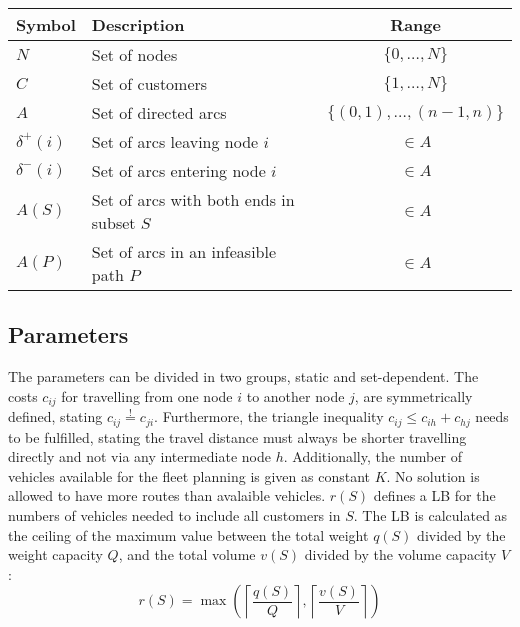 \begin{table}[ht]
    \centering
    \begin{tabular}{llc}
        \toprule
        Symbol        & Description                              & Range                         \\
        \midrule
        $N$           & Set of nodes                             & $\{ 0, \dots, N \}$           \\
        $C$           & Set of customers                         & $\{ 1, \dots, N \} $          \\
        $A$           & Set of directed arcs                     & $\{(0,1), \dots, (n-1, n) \}$ \\
        $\delta^+(i)$ & Set of arcs leaving node $i$             & $\in A$                       \\
        $\delta^-(i)$ & Set of arcs entering node $i$            & $\in A$                       \\
        $A(S)$        & Set of arcs with both ends in subset $S$ & $\in A$                       \\
        $A(P)$        & Set of arcs in an infeasible path $P$    & $\in A$                       \\
        \bottomrule
    \end{tabular}
\end{table}
\vspace{0.2em}

\subsection*{Parameters}
The parameters can be divided in two groups, static and set-dependent.
The costs $c_{ij}$ for travelling from one node $i$ to another node $j$,
are symmetrically defined, stating $c_{ij} \overset{!}{=} c_{ji}$. Furthermore, the triangle inequality
$c_{ij} \leq c_{ih} + c_{hj}$ needs to be fulfilled, stating the travel distance must always be shorter travelling
directly and not via any intermediate node $h$. Additionally, the number of vehicles
available for the fleet planning is given as constant $K$. No solution is allowed to have
more routes than avalaible vehicles. $r(S)$ defines a \gls{LB} for the numbers of vehicles needed
to include all customers in $S$. The \gls{LB} is calculated as the ceiling of the maximum
value between the total weight $q(S)$ divided by the weight capacity $Q$, and the
total volume $v(S)$ divided by the volume capacity $V$:
\[r(S) = \max\left( \left\lceil \frac{q(S)}{Q} \right\rceil, \left\lceil \frac{v(S)}{V} \right\rceil \right)\]


